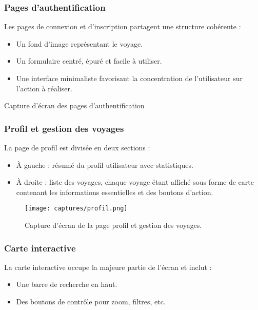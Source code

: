 \documentclass[a4paper,12pt]{article}
\begin{document}
\vspace{0.5cm}
\subsubsection{Pages d'authentification}

Les pages de connexion et d'inscription partagent une structure cohérente :

\begin{itemize}
  \item Un fond d’image représentant le voyage.
  \item Un formulaire centré, épuré et facile à utiliser.
  \item Une interface minimaliste favorisant la concentration de l’utilisateur sur l'action à réaliser.
\end{itemize}

\vspace{0.5cm}

Capture d’écran des pages d’authentification 

\subsubsection{Profil et gestion des voyages}
La page de profil est divisée en deux sections :
\begin{itemize}
  \item À gauche : résumé du profil utilisateur avec statistiques.
  \item À droite : liste des voyages, chaque voyage étant affiché sous forme de carte contenant les informations essentielles et des boutons d'action.
\end{itemize}

\vspace{0.5cm}
\begin{figure}[H]
    \centering
    \texttt{[image: captures/profil.png]}
    \caption{Capture d’écran de la page profil et gestion des voyages.}
\end{figure}

\subsubsection{Carte interactive}
La carte interactive occupe la majeure partie de l’écran et inclut :
\begin{itemize}
  \item Une barre de recherche en haut.
  \item Des boutons de contrôle pour zoom, filtres, etc.
\end{itemize}
\end{document}
